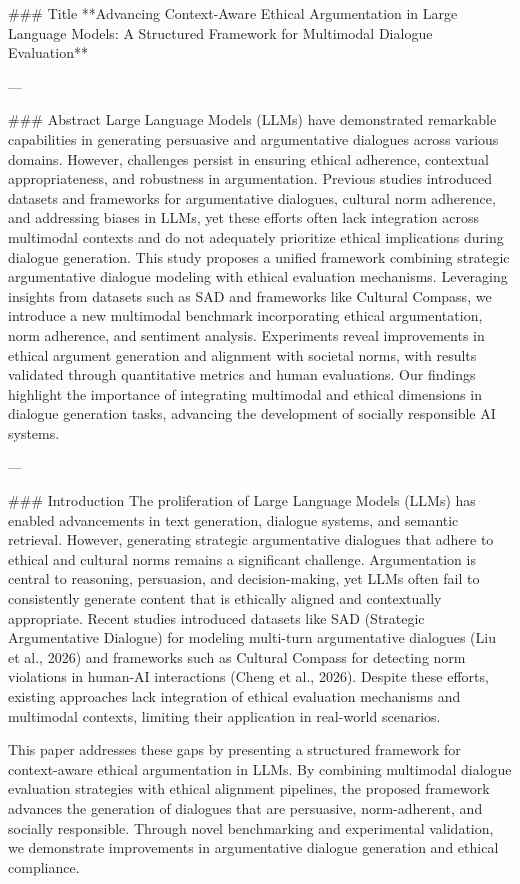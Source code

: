 ### Title  
**Advancing Context-Aware Ethical Argumentation in Large Language Models: A Structured Framework for Multimodal Dialogue Evaluation**

---

### Abstract  
Large Language Models (LLMs) have demonstrated remarkable capabilities in generating persuasive and argumentative dialogues across various domains. However, challenges persist in ensuring ethical adherence, contextual appropriateness, and robustness in argumentation. Previous studies introduced datasets and frameworks for argumentative dialogues, cultural norm adherence, and addressing biases in LLMs, yet these efforts often lack integration across multimodal contexts and do not adequately prioritize ethical implications during dialogue generation. This study proposes a unified framework combining strategic argumentative dialogue modeling with ethical evaluation mechanisms. Leveraging insights from datasets such as SAD and frameworks like Cultural Compass, we introduce a new multimodal benchmark incorporating ethical argumentation, norm adherence, and sentiment analysis. Experiments reveal improvements in ethical argument generation and alignment with societal norms, with results validated through quantitative metrics and human evaluations. Our findings highlight the importance of integrating multimodal and ethical dimensions in dialogue generation tasks, advancing the development of socially responsible AI systems.

---

### Introduction  
The proliferation of Large Language Models (LLMs) has enabled advancements in text generation, dialogue systems, and semantic retrieval. However, generating strategic argumentative dialogues that adhere to ethical and cultural norms remains a significant challenge. Argumentation is central to reasoning, persuasion, and decision-making, yet LLMs often fail to consistently generate content that is ethically aligned and contextually appropriate. Recent studies introduced datasets like SAD (Strategic Argumentative Dialogue) for modeling multi-turn argumentative dialogues (Liu et al., 2026) and frameworks such as Cultural Compass for detecting norm violations in human-AI interactions (Cheng et al., 2026). Despite these efforts, existing approaches lack integration of ethical evaluation mechanisms and multimodal contexts, limiting their application in real-world scenarios.

This paper addresses these gaps by presenting a structured framework for context-aware ethical argumentation in LLMs. By combining multimodal dialogue evaluation strategies with ethical alignment pipelines, the proposed framework advances the generation of dialogues that are persuasive, norm-adherent, and socially responsible. Through novel benchmarking and experimental validation, we demonstrate improvements in argumentative dialogue generation and ethical compliance.

